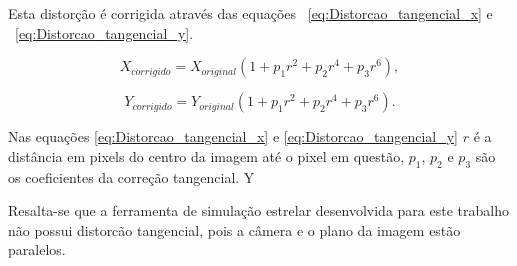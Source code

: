 Esta distorção é corrigida através das equações ~\ref{eq:Distorcao_tangencial_x} e ~\ref{eq:Distorcao_tangencial_y}.

\begin{equation}
	X_{corrigido} = X_{original} (1 + p_1 r^2 + p_2 r^4 + p_3 r^6),
	\label{eq:Distorcao_tangencial_x}
\end{equation}

\begin{equation}
	Y_{corrigido} = Y_{original} (1 + p_1 r^2 + p_2 r^4 + p_3 r^6).
	\label{eq:Distorcao_tangencial_y}
\end{equation}

Nas equações \ref{eq:Distorcao_tangencial_x} e \ref{eq:Distorcao_tangencial_y} $r$ é a distância em pixels do centro da imagem até o pixel em questão, 
$p_1$, $p_2$ e $p_3$ são os coeficientes da correção tangencial.
Y

Resalta-se que a ferramenta de simulação estrelar desenvolvida para este trabalho não possui distorcão tangencial, pois a câmera e o plano da imagem estão paralelos.

